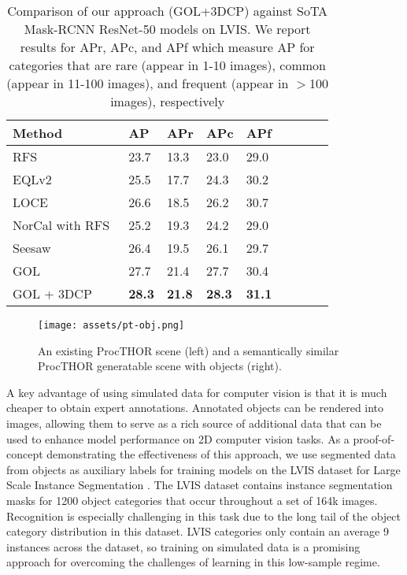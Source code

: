 \begin{table}[b!]
\centering
\begin{tabular}{l ll ll ll ll}
\toprule
Method & AP & APr & APc & APf \\
\midrule
RFS~\cite{gupta2019lvis} & 23.7 & 13.3 & 23.0 & 29.0\\
EQLv2~\cite{tan2021equalization} & 25.5 & 17.7 & 24.3 & 30.2\\
LOCE~\cite{feng2021exploring} & 26.6 & 18.5 & 26.2 & 30.7\\
NorCal with RFS~\cite{pan2021model} & 25.2 & 19.3 & 24.2 & 29.0\\
Seesaw~\cite{wang2021seesaw} & 26.4 & 19.5 & 26.1 & 29.7\\
GOL~\cite{alexandridis2022long} & 27.7 & 21.4 & 27.7 & 30.4\\
GOL + 3DCP & \textbf{28.3} & \textbf{21.8} & \textbf{28.3} & \textbf{31.1} \\
\bottomrule
\end{tabular}
\caption{Comparison of our approach (GOL+3DCP) against SoTA Mask-RCNN ResNet-50 models on LVIS. We report results for APr, APc, and APf which measure AP for categories that are rare (appear in 1-10 images), common (appear in 11-100 images), and frequent (appear in $>$100 images), respectively}
\label{seg_table}
\vspace{-1em}
\end{table}

\begin{figure*}[t!]
    \centering
    \texttt{[image: assets/pt-obj.png]}
    \vspace{-0.1in}
    \caption{An existing ProcTHOR scene (left) and a semantically similar ProcTHOR generatable scene with \data objects (right).}
    \vspace{-1.8em}
\end{figure*}

A key advantage of using simulated data for computer vision is that it is much cheaper to obtain expert annotations. Annotated \data objects can be rendered into images, allowing them to serve as a rich source of additional data that can be used to enhance model performance on 2D computer vision tasks. As a proof-of-concept demonstrating the effectiveness of this approach, we use segmented data from \data objects as auxiliary labels for training models on the LVIS dataset for Large Scale Instance Segmentation \cite{gupta2019lvis}. The LVIS dataset contains instance segmentation masks for 1200 object categories that occur throughout a set of 164k images. Recognition is especially challenging in this task due to the long tail of the object category distribution in this dataset. LVIS categories only contain an average 9 instances across the dataset, so training on simulated data is a promising approach for overcoming the challenges of learning in this low-sample regime. 


